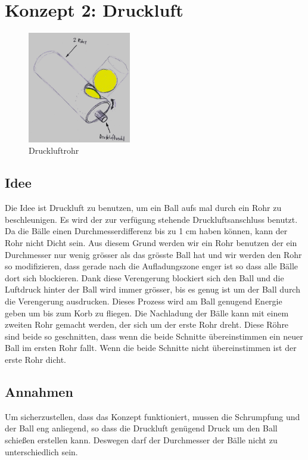 \section{Konzept 2: Druckluft}
\begin{figure}[h!]
	\centering
	\includegraphics[width=0.4\textwidth]{../../fig/Druckluftrohr.jpg}
	\caption{Druckluftrohr}
	\label{fig:druckluftrohr}
\end{figure}
\subsection{Idee}
Die Idee ist Druckluft zu benutzen, um ein Ball aufs mal durch ein Rohr zu beschleunigen. Es wird der zur verfügung stehende Druckluftsanschluss benutzt. Da die Bälle einen Durchmesserdifferenz bis zu 1 cm haben können, kann der Rohr nicht Dicht sein. Aus diesem Grund werden wir ein Rohr benutzen der ein Durchmesser nur wenig grösser als das grösste Ball hat und wir werden den Rohr so modifizieren, dass gerade nach die Aufladungszone enger ist so dass alle Bälle dort sich blockieren. Dank diese Verengerung blockiert sich den Ball und die Luftdruck hinter der Ball wird immer grösser, bis es genug ist um der Ball durch die Verengerung ausdrucken. Dieses Prozess wird am Ball genugend Energie geben um bis zum Korb zu fliegen.
Die Nachladung der Bälle kann mit einem zweiten Rohr gemacht werden, der sich um der erste Rohr dreht. Diese Röhre sind beide so geschnitten, dass wenn die beide Schnitte übereinstimmen ein neuer Ball im ersten Rohr fallt. Wenn die beide Schnitte nicht übereinstimmen ist der erste Rohr dicht.
\subsection{Annahmen}
Um sicherzustellen, dass das Konzept funktioniert, mussen die Schrumpfung und der Ball eng anliegend, so dass die Druckluft genügend Druck um den Ball schießen erstellen kann. Deswegen darf der Durchmesser der Bälle nicht zu unterschiedlich sein. 

